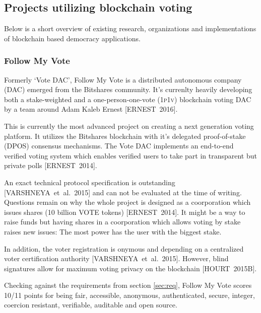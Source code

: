 \documentclass[9pt,oneside]{amsart}
\begin{document}
\begin{multicols}{2}
\subsection{Projects utilizing blockchain voting}
Below is a short overview of existing research, organizations and implementations of blockchain based democracy applications.

\subsubsection{Follow My Vote}
Formerly \enquote*{Vote DAC}, Follow My Vote is a distributed autonomous company (\textsc{DAC}) emerged from the Bitshares community. It's currenlty heavily developing both a stake-weighted and a one-person-one-vote (\textsc{1p1v}) blockchain voting DAC by a team around Adam Kaleb Ernest [ERNEST~2016].\par
This is currently the most advanced project on creating a next generation voting platform. It utilizes the Bitshares blockchain with it's delegated proof-of-stake (\textsc{DPOS}) consensus mechanisms. The Vote DAC implements an end-to-end verified voting system which enables verified users to take part in transparent but private polls [ERNEST~2014].\par
An exact technical protocol specification is outstanding [VARSHNEYA~et~al.~2015] and can not be evaluated at the time of writing. Questions remain on why the whole project is designed as a coorporation which issues shares (10 billion VOTE tokens) [ERNEST~2014]. It might be a way to raise funds but having shares in a coorporation which allows voting by stake raises new issues: The most power has the user with the biggest stake.\par
In addition, the voter registration is onymous and depending on a centralized voter certification authority [VARSHNEYA~et~al.~2015]. However, blind signatures allow for maximum voting privacy on the blockchain [HOURT~2015B].\par
Checking against the requirements from section \ref{sec:req}, Follow My Vote scores 10/11 points for being fair, accessible, anonymous, authenticated, secure, integer, coercion resistant, verifiable, auditable and open source.


\end{multicols}
\end{document}
